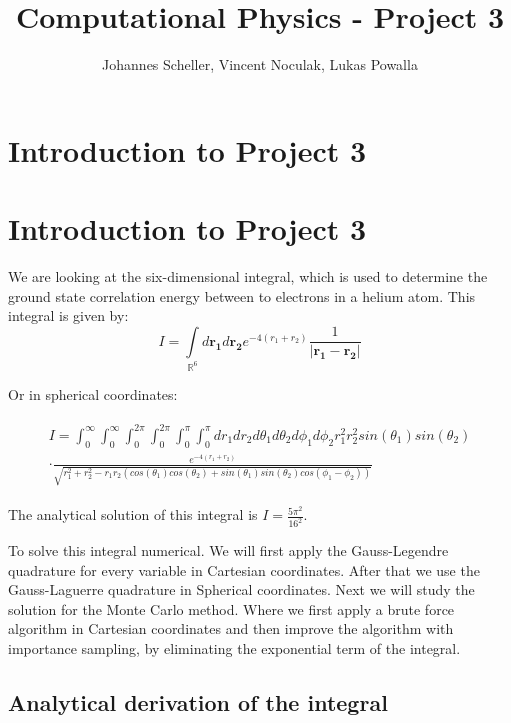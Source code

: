 \documentclass[10pt,a4paper]{article}
\author{Johannes Scheller, Vincent Noculak, Lukas Powalla}
\title{Computational Physics - Project 3}
\begin{document}
\maketitle
\newpage
\tableofcontents
\newpage
\section{Introduction to Project 3}

	
\section{Introduction to Project 3}

We are looking at the six-dimensional integral, which is used to determine the ground state correlation energy between to electrons in a helium atom. This integral is given by: 
\begin{equation}
	I = \int\limits_{\mathbb{R}^6} d\mathbf{r_1} d\mathbf{r_2} e^{-4 (r_1+r_2)} \frac{1}{|\mathbf{r_1} - \mathbf{r_2}|} 
\end{equation}

Or in spherical coordinates:

\begin{align}
	\begin{split}
		I = \int_0^\infty \int_0^\infty  \int_0^{2 \pi} \int_0^{2 \pi}  \int_0^\pi \int_0^\pi dr_1 dr_2 d\theta_1 d\theta_2 d\phi_1 d\phi_2    r_1^2 r_2^2 sin(\theta_1) sin(\theta_2)\\ \cdot \frac{e^{-4(r_1+r_2)}} {\sqrt{r_1^2+r_2^2-r_1r_2(cos(\theta_1)cos(\theta_2)+sin(\theta_1)sin(\theta_2)cos(\phi_1-\phi_2))}}
	\end{split}
\end{align}

The analytical solution of this integral is $I = \frac{5 \pi^2}{16^2}$.

To solve this integral numerical. We will first apply the Gauss-Legendre quadrature for every variable in Cartesian coordinates. After that we use the Gauss-Laguerre quadrature in Spherical coordinates. Next we will study the solution for the Monte Carlo method. Where we first apply a brute force algorithm in Cartesian coordinates and then improve the algorithm with importance sampling, by eliminating the exponential term of the integral.

\subsection{Analytical derivation of the integral }
\end{document}
